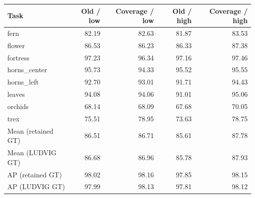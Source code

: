 \begin{tabular}{lrrrr}
\toprule
Task & Old / low & Coverage / low & Old / high & Coverage / high \\
\midrule
fern & 82.19 & 82.63 & 81.87 & 83.53 \\
flower & 86.53 & 86.23 & 86.33 & 87.38 \\
fortress & 97.23 & 96.34 & 97.16 & 97.46 \\
horns\_center & 95.73 & 94.33 & 95.52 & 95.55 \\
horns\_left & 92.70 & 93.01 & 91.71 & 94.43 \\
leaves & 94.08 & 94.06 & 91.01 & 95.06 \\
orchids & 68.14 & 68.09 & 67.68 & 70.05 \\
trex & 75.51 & 78.95 & 73.63 & 78.75 \\
\midrule
Mean (retained GT) & 86.51 & 86.71 & 85.61 & 87.78 \\
Mean (LUDVIG GT) & 86.68 & 86.96 & 85.78 & 87.93 \\
AP (retained GT) & 98.02 & 98.16 & 97.85 & 98.15 \\
AP (LUDVIG GT) & 97.99 & 98.13 & 97.81 & 98.12 \\
\bottomrule
\end{tabular}

